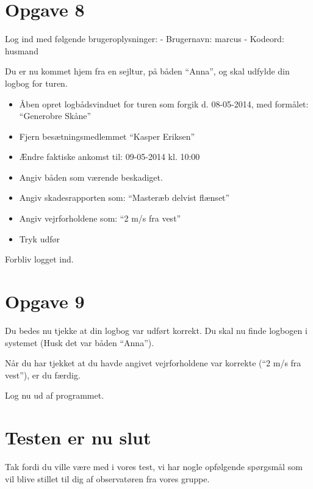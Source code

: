 \section{Opgave 8}

Log ind med følgende brugeroplysninger: 
\newline - Brugernavn: marcus
\newline - Kodeord: husmand

Du er nu kommet hjem fra en sejltur, på båden ``Anna'', og skal udfylde din logbog for turen.

\begin{itemize}
	\item Åben opret logbådsvinduet for turen som forgik d. 08-05-2014, med formålet: ``Generobre Skåne''
	\item Fjern besætningsmedlemmet ``Kasper Eriksen''
	\item Ændre faktiske ankomst til: 09-05-2014 kl. 10:00
	\item Angiv båden som værende beskadiget.
	\item Angiv skadesrapporten som: ``Masteræb delvist flænset''
	\item Angiv vejrforholdene som: ``2 m/s fra vest''
	\item Tryk udfør
\end{itemize}

Forbliv logget ind.

\section{Opgave 9}

Du bedes nu tjekke at din logbog var udført korrekt.
Du skal nu finde logbogen i systemet (Husk det var båden ``Anna'').

Når du har tjekket at du havde angivet vejrforholdene var korrekte (``2 m/s fra vest''), er du færdig.

Log nu ud af programmet.

\section{Testen er nu slut}

Tak fordi du ville være med i vores test, vi har nogle opfølgende spørgsmål som vil blive stillet til dig af observatøren fra vores gruppe.

